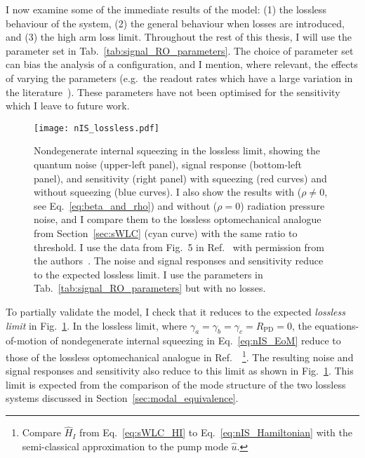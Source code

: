 I now examine some of the immediate results of the model: (1) the lossless behaviour of the system, (2) the general behaviour when losses are introduced, and (3) the high arm loss limit.
Throughout the rest of this thesis, I will use the parameter set in Tab.~\ref{tab:signal_RO_parameters}. The choice of parameter set can bias the analysis of a configuration, and I mention, where relevant, the effects of varying the parameters (e.g.\ the readout rates which have a large variation in the literature~\cite{liBroadbandSensitivityImprovement2020,miaoDesignGravitationalWaveDetectors2018,korobkoQuantumExpanderGravitationalwave2019}). These parameters have not been optimised for the sensitivity which I leave to future work. %

\label{sec:nIS_lossless_limit}

\begin{figure}
    \centering
    \texttt{[image: nIS\_lossless.pdf]}
    \caption{Nondegenerate internal squeezing in the lossless limit, showing the quantum noise (upper-left panel), signal response (bottom-left panel), and sensitivity (right panel) with squeezing (red curves) and without squeezing (blue curves). I also show the results with ($\rho\neq0$, see Eq.~\ref{eq:beta_and_rho}) and without ($\rho=0$) radiation pressure noise, and I compare them to the lossless optomechanical analogue from Section~\ref{sec:sWLC} (cyan curve) with the same ratio to threshold. I use the data from Fig.~5 in Ref.~\cite{liBroadbandSensitivityImprovement2020} with permission from the authors~\cite{xiangLiPersonalCommunication}. The noise and signal responses and sensitivity reduce to the expected lossless limit. I use the parameters in Tab.~\ref{tab:signal_RO_parameters} but with no losses.}
    \label{fig:nIS_lossless}
\end{figure}

To partially validate the model, I check that it reduces to the expected \emph{lossless limit} in Fig.~\ref{fig:nIS_lossless}.
In the lossless limit, where $\gamma_a=\gamma_b=\gamma_c=R_\text{PD}=0$, the equations-of-motion of nondegenerate internal squeezing in Eq.~\ref{eq:nIS_EoM} reduce to those of the lossless optomechanical analogue in Ref.~\cite{liBroadbandSensitivityImprovement2020}~\footnote{Compare $\hat H_I$ from Eq.~\ref{eq:sWLC_HI} to Eq.~\ref{eq:nIS_Hamiltonian} with the semi-classical approximation to the pump mode $\hat u$.}. The resulting noise and signal responses and sensitivity also reduce to this limit as shown in Fig.~\ref{fig:nIS_lossless}. This limit is expected from the comparison of the mode structure of the two lossless systems discussed in Section~\ref{sec:modal_equivalence}.

